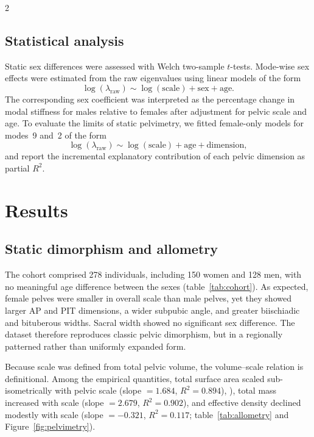 \documentclass[openacc]{rsproca_new}
\begin{document}
\begin{multicols}{2}
\subsection{Statistical analysis}

Static sex differences were assessed with Welch two-sample $t$-tests. Mode-wise sex effects were estimated from the raw eigenvalues using linear models of the form
\begin{equation}
\log(\lambda_{\mathrm{raw}}) \sim \log(\mathrm{scale}) + \mathrm{sex} + \mathrm{age}.
\end{equation}
The corresponding sex coefficient was interpreted as the percentage change in modal stiffness for males relative to females after adjustment for pelvic scale and age. To evaluate the limits of static pelvimetry, we fitted female-only models for modes~9 and~2 of the form
\begin{equation}
\log(\lambda_{\mathrm{raw}}) \sim \log(\mathrm{scale}) + \mathrm{age} + \mathrm{dimension},
\end{equation}
and report the incremental explanatory contribution of each pelvic dimension as partial $R^2$.

\section{Results}

\subsection{Static dimorphism and allometry}

The cohort comprised 278 individuals, including 150 women and 128 men, with no meaningful age difference between the sexes (table~\ref{tab:cohort}). As expected, female pelves were smaller in overall scale than male pelves, yet they showed larger AP and PIT dimensions, a wider subpubic angle, and greater biischiadic and bituberous widths. Sacral width showed no significant sex difference. The dataset therefore reproduces classic pelvic dimorphism, but in a regionally patterned rather than uniformly expanded form.

Because scale was defined from total pelvic volume, the volume–scale relation is definitional. Among the empirical quantities, total surface area scaled sub-isometrically with pelvic scale (slope $=1.684$, $R^2=0.894$), ), total mass increased with scale (slope $=2.679$, $R^2=0.902$), and effective density
declined modestly with scale (slope $=-0.321$, $R^2=0.117$; table~\ref{tab:allometry} and Figure~\ref{fig:pelvimetry}).


\end{multicols}
\end{document}

